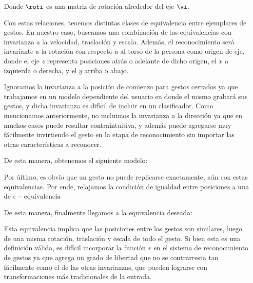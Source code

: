Donde $\roti$ es una matriz de rotación alrededor del eje $\vi$. 


Con estas relaciones, tenemos distintas clases de equivalencia entre ejemplares de gestos. En nuestro caso, buscamos una combinación de las equivalencias con invarianza a la velocidad, traslación y escala. Además, el reconocimiento será invariante a la rotación con respecto a al torso de la persona como origen de eje, donde el eje $z$ representa posiciones atrás o adelante de dicho origen, el $x$ a izquierda o derecha, y el $y$ arriba o abajo.

Ignoramos la invarianza a la posición de comienzo para gestos cerrados ya que trabajamos en un modelo dependiente del usuario en donde el mismo grabará sus gestos, y dicha invarianza es difícil de incluir en un clasificador. Como mencionamos anteriormente, no incluimos la invarianza a la dirección ya que en muchos casos puede resultar contraintuitiva, y además puede agregarse muy fácilmente invirtiendo el gesto en la etapa de reconocimiento sin importar las otras características a reconocer. 

De esta manera, obtenemos el siguiente modelo:


\newcommand{\eequiv}{=_{\epsilon}}

Por último, es obvio que un gesto no puede replicarse exactamente, aún con estas equivalencias. Por ende, relajamos la condición de igualdad entre posiciones a una de $\epsilon-\text{equivalencia}$


\tci{a &\eequiv b}{
& \norm{a-b} < \epsilon
\\& \text{donde} \; \epsilon \in \reals, \; a,b \in \reals^3
\\& \text{y} \; \norm{\cdot} \quad \text{es una norma en $\reals^3$}
}

De esta manera, finalmente llegamos a la equivalencia deseada:


\equivalencia{ m}{
 &\existsv, \; \existsroti 
 \\& \existsb, \; \existsa
\\& c(t) \eequiv a (\roti c'(v(t)))+b
}

Esta equivalencia implica que las posiciones entre los gestos son similares, luego de una misma rotación, traslación y escala de todo el gesto. Si bien esta es una definición válida, es difícil incorporar la función $v$ en el sistema de reconocimiento de gestos ya que agrega un grado de libertad que no se contrarresta tan fácilmente como el de las otras invarianzas, que pueden lograrse con transformaciones más tradicionales de la entrada.

